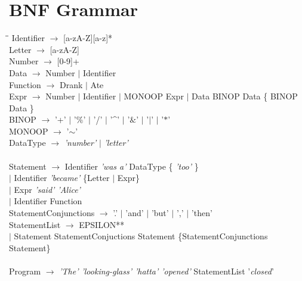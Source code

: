\documentclass[a4wide, 11pt]{article}
\begin{document}
\section{BNF Grammar}
\label{sec:bnf}
	\begin{tabbing}
	\hspace*{9mm}\=\hspace*{25mm}\=\kill
		\> Identifier $\rightarrow$ [a-zA-Z][a-z]* \\
		\> Letter $\rightarrow$ [a-zA-Z] \\
		\> Number $\rightarrow$ [0-9]+ \\
		\> Data $\rightarrow$ Number $\mid$ Identifier \\
		\> Function $\rightarrow$ Drank $\mid$ Ate \\
		\> Expr	$\rightarrow$ Number $\mid$ Identifier $\mid$ MONOOP Expr 
					$\mid$ Data BINOP Data \{ BINOP Data \}\\
		\> BINOP $\rightarrow$ '+' $\mid$ '$\%$' $\mid$ '/' $\mid$ '\^{ }' 
							$\mid$ '$\&$' $\mid$ '$\mid$' $\mid$ '$\ast$' \\
		\> MONOOP $\rightarrow$ '$\mathtt{\sim}$'\\
		\> DataType $\rightarrow$ \emph{'number'} $\mid$ \emph{'letter'} \\
		\\
		\> Statement $\rightarrow$ Identifier \emph{'was a'} DataType \{ \emph{'too'} \}\\
		\> \> $\mid$ Identifier \emph{'became'} \{Letter $\mid$ Expr\} \\
		\> \>	$\mid$ Expr \emph{'said' 'Alice'} \\
		\> \> $\mid$ Identifier Function \\
		\> StatementConjunctions $\rightarrow$ '.' $\mid$ 'and' $\mid$ 'but' $\mid$ ',' $\mid$ 'then' \\
		\> StatementList $\rightarrow$ EPSILON** \\ 
		\> \> $\mid$ Statement StatementConjuctions Statement \{StatementConjunctions Statement\} \\
	 	\\
		\> Program $\rightarrow$ \emph{'The' 'looking-glass' 'hatta' 'opened'} StatementList '\emph{closed}'
	\end{tabbing}

\begin{verbatim}
\end{verbatim}
\end{document}
